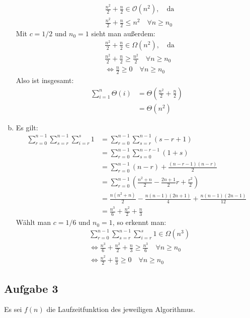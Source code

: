 \documentclass[11pt]{article}
\begin{document}
\begin{enumerate}[(a)]
\begin{align*}
      &\frac{n^2}{2} + \frac{n}{2} \in \mathcal{O}(n^2),\quad\text{da}
      \\ &\frac{n^2}{2} + \frac{n}{2} \leq n^2 \quad\forall n \geq n_0
    \end{align*}
    Mit $c = 1/2$ und $n_0 = 1$ sieht man außerdem:
    \begin{align*}
      &\frac{n^2}{2} + \frac{n}{2} \in \Omega (n^2),\quad\text{da}
      \\ &\frac{n^2}{2} + \frac{n}{2} \geq\frac{n^2}{2}\quad\forall n\geq n_0
      \\ &\Leftrightarrow \frac{n}{2} \geq 0 \quad\forall n \geq n_0
    \end{align*}
    Also ist insgesamt:
    \begin{align*}
      \sum_{i=1}^n \Theta (i) &= \Theta \left(\frac{n^2}{2}+\frac{n}{2}\right)
      \\ &= \Theta (n^2)
    \end{align*}
  \item Es gilt:
    \begin{align*}
      \sum_{r=0}^{n-1} \sum_{s=r}^{n-1} \sum_{i=r}^{s} 1 &= \sum_{r=0}^{n-1}
        \sum_{s=r}^{n-1} (s-r+1)
      \\ &= \sum_{r=0}^{n-1} \sum_{s=0}^{n-r-1} (1+s)
      \\ &= \sum_{r=0}^{n-1} (n-r) + \frac{(n-r-1)(n-r)}{2}
      \\ &= \sum_{r=0}^{n-1} \left(\frac{n^2+n}{2}-\frac{2n+1}{2}r+
        \frac{r^2}{2}\right)
      \\ &= \frac{n(n^2+n)}{2}-\frac{n(n-1)(2n+1)}{4}+\frac{n(n-1)(2n-1)}{12}
      \\ &= \frac{n^3}{6} + \frac{n^2}{2} + \frac{n}{3}
    \end{align*}
     Wählt man $c = 1/6$ und $n_0 = 1$, so erkennt man:
     \begin{align*}
       &\sum_{r=0}^{n-1} \sum_{s=r}^{n-1} \sum_{i=r}^{s} 1 \in \Omega (n^3)
       \\ &\Leftrightarrow \frac{n^3}{6} + \frac{n^2}{2} + \frac{n}{3} \geq
         \frac{n^3}{6} \quad\forall n \geq n_0
       \\&\Leftrightarrow\frac{n^2}{2}+\frac{n}{3}\geq 0\quad\forall n\geq n_0
     \end{align*}
\end{enumerate}

\subsection*{Aufgabe 3}
%
Es sei $f(n)$ die Laufzeitfunktion des jeweiligen Algorithmus.
\end{document}
